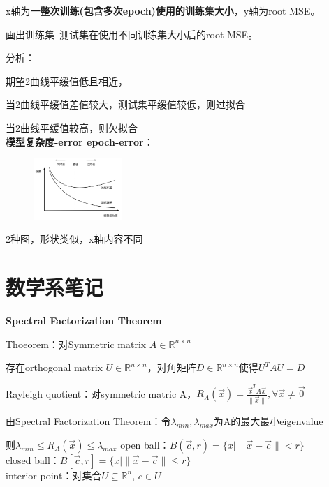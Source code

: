 \documentclass[UTF8]{ctexart}
\begin{document}
  x轴为\textbf{一整次训练(包含多次epoch)使用的训练集大小}，y轴为root MSE。

  画出训练集\ 测试集在使用不同训练集大小后的root MSE。

  分析：

  \quad 期望2曲线平缓值低且相近，

  \quad 当2曲线平缓值差值较大，测试集平缓值较低，则过拟合

  \quad 当2曲线平缓值较高，则欠拟合\\
\textbf{模型复杂度-error epoch-error}：

  \begin{figure}[H] %
    \centering %
    \includegraphics[width=0.3\textwidth]{note_images/epoch-complex-error.png} %
  \end{figure}

  2种图，形状类似，x轴内容不同\\


\section{数学系笔记}
\noindent \textbf{Spectral Factorization Theorem}

  Thoeorem：对Symmetric matrix $A \in \mathbb{R}^{n \times n}$
  
  \quad 存在orthogonal matrix $U \in \mathbb{R}^{n \times n}$，对角矩阵$D \in \mathbb{R}^{n \times n}$使得$U^TAU = D$

  Rayleigh quotient：对symmetric matric A，$R_A(\vec{x}) = \frac{\vec{x}^TA\vec{x}}{\|\vec{x}\|}, \forall \vec{x} \neq \vec{0}$

  由Spectral Factorization Theorem：令$\lambda_{min}, \lambda_{max}$为A的最大最小eigenvalue

  \quad 则$\lambda_{min} \leq R_A(\vec{x}) \leq \lambda_{max}$
open ball：$B(\vec{c}, r) = \{x | \|\vec{x} - \vec{c}\| < r\}$\\
closed ball：$B[\vec{c}, r] = \{x | \|\vec{x} - \vec{c}\| \leq r\}$\\
interior point：对集合$U \subseteq \mathbb{R}^n$, $c \in U$
\end{document}
